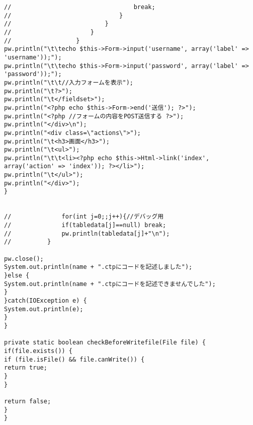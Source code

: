 \documentclass{funthesis}
\begin{document}
\begin{lstlisting}[caption=WriteView.java,label=1]
//									break;
//								}
//							}
//						}
//					}
pw.println("\t\techo $this->Form->input('username', array('label' => 'username'));");
pw.println("\t\techo $this->Form->input('password', array('label' => 'password'));");
pw.println("\t\t//入力フォームを表示");
pw.println("\t?>");
pw.println("\t</fieldset>");
pw.println("<?php echo $this->Form->end('送信'); ?>");
pw.println("<?php //フォームの内容をPOST送信する ?>");
pw.println("</div>\n");
pw.println("<div class=\"actions\">");
pw.println("\t<h3>画面</h3>");
pw.println("\t<ul>");
pw.println("\t\t<li><?php echo $this->Html->link('index', array('action' => 'index')); ?></li>");
pw.println("\t</ul>");
pw.println("</div>");
}


//				for(int j=0;;j++){//デバッグ用
//				if(tabledata[j]==null) break;
//				pw.println(tabledata[j]+"\n");
//			}

pw.close();
System.out.println(name + ".ctpにコードを記述しました");
}else {
System.out.println(name + ".ctpにコードを記述できませんでした");
}
}catch(IOException e) {
System.out.println(e);
}
}

private static boolean checkBeforeWritefile(File file) {
if(file.exists()) {
if (file.isFile() && file.canWrite()) {
return true;
}
}

return false;
}
}
\end{lstlisting}　
\end{document}
